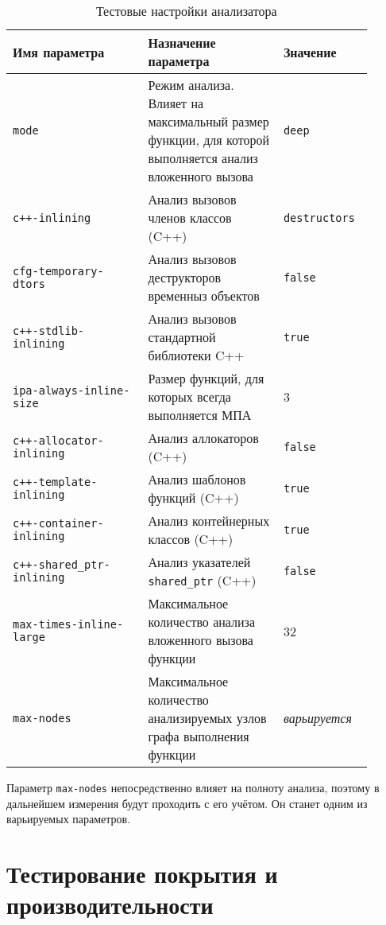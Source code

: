 \begin{table} [htbp]
  \centering
  \parbox{15cm}{\caption{Тестовые настройки анализатора}\label{table:test-settings}}
  \begin{tabular}{| p{0.35\linewidth} || p{0.35\linewidth} | p{0.2\linewidth} |}
  \hline
  \hline
  Имя параметра  & Назначение параметра & Значение \\
  \hline
  \hline
  \texttt{mode}   & Режим анализа. Влияет на максимальный размер функции, для которой выполняется анализ вложенного вызова & \texttt{deep} \\
  \hline
  \texttt{c++-inlining} & Анализ вызовов членов классов (C++) & \texttt{destructors}   \\
  \hline
  \texttt{cfg-temporary-dtors}   & Анализ вызовов деструкторов временныз объектов  & \texttt{false}    \\
  \hline
  \texttt{c++-stdlib-inlining} & Анализ вызовов стандартной библиотеки C++ & \texttt{true}   \\
  \hline
  \texttt{ipa-always-inline-size} & Размер функций, для которых всегда выполняется МПА & 3   \\
  \hline
  \texttt{c++-allocator-inlining} & Анализ аллокаторов (C++) & \texttt{false}   \\
  \hline
  \texttt{c++-template-inlining} & Анализ шаблонов функций (C++) & \texttt{true}   \\
  \hline
  \texttt{c++-container-inlining} & Анализ контейнерных классов (C++) & \texttt{true}   \\
  \hline
  \texttt{c++-shared\_ptr-inlining} & Анализ указателей \texttt{shared\_ptr} (C++) & \texttt{false}   \\
  \hline
  \texttt{max-times-inline-large} & Максимальное количество анализа вложенного вызова функции & 32   \\
  \hline
  \texttt{max-nodes} & Максимальное количество анализируемых узлов графа выполнения функции & \textit{варьируется}   \\
  \hline
  \hline
  \end{tabular}
\end{table}

Параметр \texttt{max-nodes} непосредственно влияет на полноту анализа, поэтому в дальнейшем измерения будут проходить с его учётом. Он станет одним из варьируемых параметров.

\section{Тестирование покрытия и производительности}

